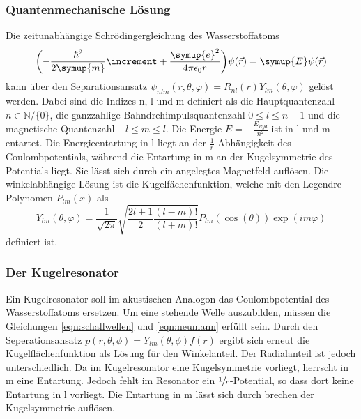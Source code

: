 \subsubsection{Quantenmechanische Lösung}
Die zeitunabhängige Schrödingergleichung des Wasserstoffatoms
\begin{equation} 
    \biggl(-\frac{\hbar^2}{2 \symup{m}} \increment + \frac{\symup{e}^2}{4 \pi \epsilon_0 r}\biggr)\psi(\vec{r}) = \symup{E} \psi(\vec{r})
    \label{eqn:schrödingerwass}
\end{equation}
kann über den Separationsansatz $\psi_{nlm}(r,\theta, \varphi) = R_{nl}(r) Y_{lm}(\theta, \varphi)$ gelöst werden.
Dabei sind die Indizes n, l und m definiert als die Hauptquantenzahl $n \in \mathbb{N}/\{0\}$, die ganzzahlige Bahndrehimpulsquantenzahl
$0 \leq l \leq n-1$ und die magnetische Quantenzahl $ -l \leq m \leq l$.
Die Energie $E = -\frac{E_{Ryd}}{n^2}$ ist in l und m entartet. Die Energieentartung in l liegt an der $\frac{1}{r}$-Abhängigkeit des Coulombpotentials, während die 
Entartung in m an der Kugelsymmetrie des Potentials liegt. Sie lässt sich durch ein angelegtes Magnetfeld auflösen. 
Die winkelabhängige Lösung ist die Kugelfächenfunktion, welche mit den Legendre-Polynomen $P_{lm}(x)$ als
\begin{equation}
    Y_{lm}(\theta, \varphi) = \frac{1}{\sqrt{2\pi}} \sqrt{\frac{2l+1}{2}\frac{(l-m)!}{(l+m)!}} P_{lm}(\cos(\theta)) \exp(im\varphi)
\end{equation}
definiert ist.
\subsubsection{Der Kugelresonator}
Ein Kugelresonator soll im akustischen Analogon das Coulombpotential des Wasserstoffatoms ersetzen.
Um eine stehende Welle auszubilden, müssen die Gleichungen \ref{eqn:schallwellen} und \ref{eqn:neumann} erfüllt sein. Durch den Seperationsansatz
$p(r, \theta, \phi) = Y_{lm}(\theta, \phi) f(r)$ ergibt sich erneut die Kugelflächenfunktion als Lösung für den Winkelanteil.
Der Radialanteil ist jedoch unterschiedlich. Da im Kugelresonator eine Kugelsymmetrie vorliegt, herrscht in m eine Entartung.
Jedoch fehlt im Resonator ein $\sfrac{1}{r}$-Potential, so dass dort keine Entartung in l vorliegt. 
Die Entartung in m lässt sich durch brechen der Kugelsymmetrie auflösen.

